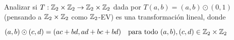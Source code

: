 \item Analizar si $T:\mathbb{Z}_2\times\mathbb{Z}_2\to\mathbb{Z}_2\times\mathbb{Z}_2$ dada por $T(a,b)=(a,b)\odot(0,1)$ (pensando a $\mathbb{Z}_2\times\mathbb{Z}_2$ como $\mathbb{Z}_2$-EV) es una transformación lineal, donde
    \begin{center}
        $(a,b)\odot(c,d)=(ac+bd,ad+bc+bd)\quad \text{para todo }(a,b),(c,d)\in\mathbb{Z}_2\times\mathbb{Z}_2$      
    \end{center}    
    \begin{mdframed}[style=s]
        
    \end{mdframed}